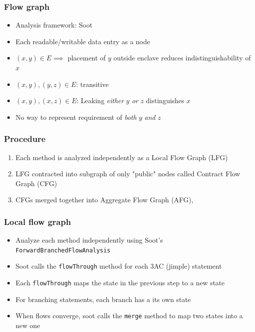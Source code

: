 \documentclass{beamer}
\newcommand{\code}[1]{\colorbox{code}{\texttt{\footnotesize #1}}}
\begin{document}
\begin{frame}
  \frametitle{Flow graph}
  \begin{itemize}
    \item Analysis framework: Soot \cite{sootsurvivor}
    \item Each readable/writable data entry as a node
    \item $(x, y) \in E \implies$ placement of $y$ outside enclave
      reduces indistinguishability of $x$
    \item $(x, y), (y, z) \in E$: transitive
    \item $(x, y), (x, z) \in E$: Leaking \emph{either} $y$ \emph{or} $z$ distinguishes $x$
    \item No way to represent requirement of \emph{both} $y$ \emph{and} $z$
  \end{itemize}
\end{frame}

\begin{frame}
  \frametitle{Procedure}
  \begin{enumerate}
    \item Each method is analyzed independently as a Local Flow Graph (LFG)
    \item LFG contracted into subgraph of only "public" nodes called Contract Flow Graph (CFG)
    \item CFGs merged together into Aggregate Flow Graph (AFG),
  \end{enumerate}
\end{frame}

\begin{frame}
  \frametitle{Local flow graph}
  \begin{itemize}
    \item Analyze each method independently using Soot's \code{ForwardBranchedFlowAnalysis}
    \item Soot calls the \code{flowThrough} method for each 3AC (jimple) statement
    \item Each \code{flowThrough} maps the state in the previous step to a new state
    \item For branching statements, each branch has a its own state
    \item When flows converge, soot calls the \code{merge} method to map two states into a new one
  \end{itemize}
\end{frame}
\end{document}
